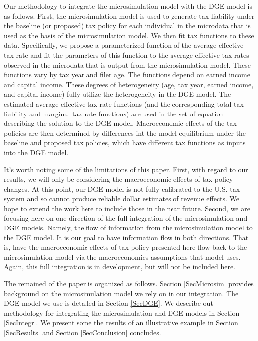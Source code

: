 \documentclass[letterpaper,12pt]{article}
\theoremstyle{definition}
\begin{document}
\begin{spacing}{1.5}
Our methodology to integrate the microsimulation model with the DGE model is as follows.  First, the microsimulation model is used to generate tax liability under the baseline (or proposed) tax policy for each individual in the microdata that is used as the basis of the microsimulation model.  We then fit tax functions to these data.  Specifically, we propose a parameterized function of the average effective tax rate and fit the parameters of this function to the average effective tax rates observed in the microdata that is output from the microsimulation model.  These functions vary by tax year and filer age.  The functions depend on earned income and capital income.  These degrees of heterogeneity (age, tax year, earned income, and capital income) fully utilize the heterogeneity in the DGE model.  The estimated average effective tax rate functions (and the corresponding total tax liability and marginal tax rate functions) are used in the set of equation describing the solution to the DGE model.  Macroeconomic effects of the tax policies are then determined by differences int the model equilibrium under the baseline and proposed tax policies, which have different tax functions as inputs into the DGE model.

It's worth noting some of the limitations of this paper.  First, with regard to our results, we will only be considering the macroeconomic effects of tax policy changes.  At this point, our DGE model is not fully calibrated to the U.S. tax system and so cannot produce reliable dollar estimates of revenue effects.  We hope to extend the work here to include those in the near future.  Second, we are focusing here on one direction of the full integration of the microsimulation and DGE models. Namely, the flow of information from the microsimulation model to the DGE model.  It is our goal to have information flow in both directions.  That is, have the macroeconomic effects of tax policy presented here flow back to the microsimulation model via the macroeconomics assumptions that model uses.  Again, this full integration is in development, but will not be included here.  

The remained of the paper is organized as follows.  Section \ref{SecMicrosim} provides background on the microsimulation model we rely on in our integration.  The DGE model we use is detailed in Section \ref{SecDGE}.  We describe out methodology for integrating the microsimulation and DGE models in Section \ref{SecIntegr}.  We present some the results of an illustrative example in Section \ref{SecResults} and Section \ref{SecConclusion} concludes.



\end{spacing}
\end{document}
